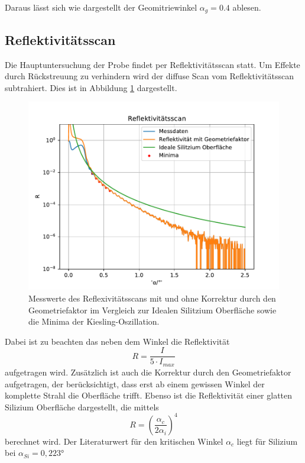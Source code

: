 Daraus lässt sich wie dargestellt der Geomitriewinkel $\alpha_g = 0.4$ ablesen.



\subsection{Reflektivitätsscan}
Die Hauptuntersuchung der Probe findet per Reflektivitätsscan statt.
Um Effekte durch Rückstreuung zu verhindern wird der diffuse Scan vom Reflektivitätsscan subtrahiert.
Dies ist in Abbildung \ref{fig:ref} dargestellt.
\begin{figure}[h]
    \centering
    \includegraphics[width = 1\textwidth]{Auswertung/Graphen/Reflektivitaetsscan.pdf}
    \caption{Messwerte des Reflexivitätsscans mit und ohne Korrektur durch den Geometriefaktor im Vergleich zur Idealen Silitzium Oberfläche sowie die Minima der Kiesling-Oszillation.}
    \label{fig:ref}
\end{figure}
Dabei ist zu beachten das neben dem Winkel die Reflektivität
\begin{equation*}
    R = \frac{I}{5\cdot I_{max}} 
\end{equation*}
aufgetragen wird.
Zusätzlich ist auch die Korrektur durch den Geometriefaktor aufgetragen,
der berücksichtigt,
dass erst ab einem gewissen Winkel der komplette Strahl die Oberfläche trifft.
Ebenso ist die Reflektivität einer glatten Silizium Oberfläche dargestellt,
die mittels
\begin{equation}
    R = \left(\frac{\alpha_c}{2\alpha_i}\right)^4
\end{equation}
berechnet wird. 
Der Literaturwert für den kritischen Winkel $\alpha_c$ liegt für Silizium bei $\alpha_{Si} = 0,223°$ \cite{wert}

